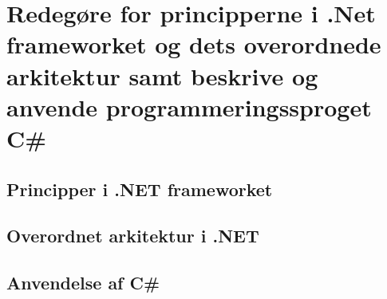 \section{Redegøre for principperne i .Net frameworket og dets overordnede arkitektur samt beskrive og anvende programmeringssproget C\#}\label{sec:spm1}

\subsection{Principper i .NET frameworket}


\subsection{Overordnet arkitektur i .NET}

\subsection{Anvendelse af C\#}